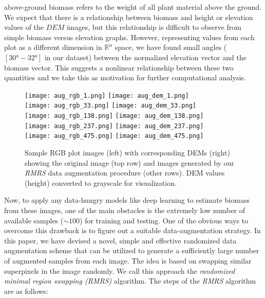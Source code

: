 \documentclass[10pt,twocolumn,letterpaper]{article}
\begin{document}
above-ground biomass refers to the weight of all plant material above the ground. We expect that there is a relationship between biomass and height or elevation values of the $DEM$ images, but this relationship is difficult to observe from simple biomass versus elevation graphs. However, representing values from each plot as a different dimension in $\mathbb{R}^n$ space, we have found small angles ($[30\si{\degree}-32\si{\degree}]$ in our dataset) between the normalized elevation vector and the biomass vector. This suggests a nonlinear relationship between these two quantities and we take this as motivation for further computational analysis.

\begin{figure}[t]
	\centering
	\texttt{[image: aug\_rgb\_1.png]}
	\texttt{[image: aug\_dem\_1.png]} \\
	\texttt{[image: aug\_rgb\_33.png]}
	\texttt{[image: aug\_dem\_33.png]} \\
	\texttt{[image: aug\_rgb\_138.png]}
	\texttt{[image: aug\_dem\_138.png]} \\
	\texttt{[image: aug\_rgb\_237.png]}
	\texttt{[image: aug\_dem\_237.png]} \\
	\texttt{[image: aug\_rgb\_475.png]}
	\texttt{[image: aug\_dem\_475.png]}
    \caption{Sample RGB plot images (left) with corresponding DEMs (right) showing the original image (top row) and images generated by our \emph{RMRS} data augmentation procedure (other rows). DEM values (height) converted to grayscale for visualization.}
    \label{fig:sample_augment}
\end{figure}

Now, to apply any data-hungry models like deep learning to estimate biomass from these images, one of the main obstacles is the extremely low number of available samples ($\sim100$) for training and testing. One of the obvious ways to overcome this drawback is to figure out a suitable data-augmentation strategy. In this paper, we have devised a novel, simple and effective randomized data augmentation scheme that can be utilized to generate a sufficiently large number of augmented samples from each image. The idea is based on swapping similar superpixels in the image randomly. We call this approach the \textit{randomized minimal region swapping (RMRS)} algorithm. The steps of the \textit{RMRS} algorithm are as follows:
\end{document}
